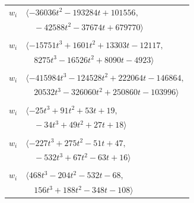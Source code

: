 \documentclass[11pt]{article}
\begin{document}
\begin{longtable}{@{}ll@{}}
$w_i$ & $\langle -36036t^{2}-193284t+101556,$\\
 & $\quad -42588t^{2}-37674t+679770\rangle$\\
\addlinespace[2pt]
\multicolumn{2}{@{}p{0.97\textwidth}@{}}{$i=27$, $D_i=4096$, $\rho_{ij}$: $8{:}2, \allowbreak 11{:}1, \allowbreak 12{:}2, \allowbreak 13{:}2, \allowbreak 14{:}2, \allowbreak 20{:}2, \allowbreak 30{:}1, \allowbreak 35{:}2, \allowbreak 36{:}2, \allowbreak 37{:}2, \allowbreak 51{:}1$}\\
$w_i$ & $\langle -15751t^{3}+1601t^{2}+13303t-12117,$\\
 & $\quad 8275t^{3}-16526t^{2}+8090t-4923\rangle$\\
\addlinespace[2pt]
\multicolumn{2}{@{}p{0.97\textwidth}@{}}{$i=28$, $D_i=8192$, $\rho_{ij}$: $0{:}2, \allowbreak 6{:}1, \allowbreak 11{:}1, \allowbreak 12{:}2, \allowbreak 14{:}1, \allowbreak 16{:}2, \allowbreak 25{:}1, \allowbreak 35{:}1, \allowbreak 36{:}2, \allowbreak 37{:}2, \allowbreak 39{:}1, \allowbreak 40{:}1, \allowbreak 46{:}2, \allowbreak 52{:}2$}\\
$w_i$ & $\langle -415984t^{3}-124528t^{2}+222064t-146864,$\\
 & $\quad 20532t^{3}-326060t^{2}+250860t-103996\rangle$\\
\addlinespace[2pt]
\multicolumn{2}{@{}p{0.97\textwidth}@{}}{$i=29$, $D_i=16$, $\rho_{ij}$: $0{:}1, \allowbreak 3{:}2, \allowbreak 8{:}1, \allowbreak 10{:}2, \allowbreak 15{:}2, \allowbreak 18{:}2, \allowbreak 22{:}2, \allowbreak 34{:}2$}\\
$w_i$ & $\langle -25t^{3}+91t^{2}+53t+19,$\\
 & $\quad -34t^{3}+49t^{2}+27t+18\rangle$\\
\addlinespace[2pt]
\multicolumn{2}{@{}p{0.97\textwidth}@{}}{$i=30$, $D_i=64$, $\rho_{ij}$: $0{:}1, \allowbreak 9{:}1, \allowbreak 10{:}1, \allowbreak 11{:}2, \allowbreak 16{:}1, \allowbreak 27{:}2, \allowbreak 32{:}2, \allowbreak 37{:}2$}\\
$w_i$ & $\langle -227t^{3}+275t^{2}-51t+47,$\\
 & $\quad -532t^{3}+67t^{2}-63t+16\rangle$\\
\addlinespace[2pt]
\multicolumn{2}{@{}p{0.97\textwidth}@{}}{$i=31$, $D_i=128$, $\rho_{ij}$: $3{:}2, \allowbreak 10{:}2, \allowbreak 21{:}2, \allowbreak 32{:}2, \allowbreak 37{:}1, \allowbreak 52{:}2, \allowbreak 53{:}2, \allowbreak 54{:}1$}\\
$w_i$ & $\langle 468t^{3}-204t^{2}-532t-68,$\\
 & $\quad 156t^{3}+188t^{2}-348t-108\rangle$\\

\end{longtable}
\end{document}
